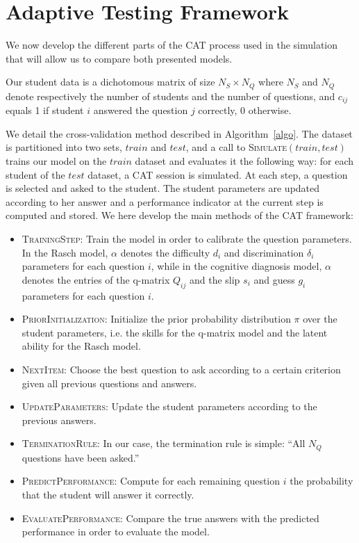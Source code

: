 \documentclass{edm_template}
\begin{document}

\section{Adaptive Testing Framework}

We now develop the different parts of the CAT process used in the simulation that will allow us to compare both presented models.

Our student data is a dichotomous matrix of size $N_S \times N_Q$ where $N_S$ and $N_Q$ denote respectively the number of students and the number of questions, and $c_{ij}$ equals 1 if student $i$ answered the question $j$ correctly, 0 otherwise. 

We detail the cross-validation method described in Algorithm~\ref{algo}. The dataset is partitioned into two sets, $train$ and $test$, and a call to \textsc{Simulate}$(train, test)$ trains our model on the $train$ dataset and evaluates it the following way: for each student of the $test$ dataset, a CAT session is simulated. At each step, a question is selected and asked to the student. The student parameters are updated according to her answer and a performance indicator at the current step is computed and stored. We here develop the main methods of the CAT framework:

\begin{itemize}
\item \textsc{TrainingStep}: Train the model in order to calibrate the question parameters. In the Rasch model, $\alpha$ denotes the difficulty $d_i$ and discrimination $\delta_i$ parameters for each question $i$, while in the cognitive diagnosis model, $\alpha$ denotes the entries of the q-matrix $Q_{ij}$ and the slip $s_i$ and guess $g_i$ parameters for each question $i$.
\item \textsc{PriorInitialization}: Initialize the prior probability distribution $\pi$ over the student parameters, i.e. the skills for the q-matrix model and the latent ability for the Rasch model. 
\item \textsc{NextItem}: Choose the best question to ask according to a certain criterion given all previous questions and answers. 
\item \textsc{UpdateParameters}: Update the student parameters according to the previous answers.
\item \textsc{TerminationRule}: In our case, the termination rule is simple: ``All $N_Q$ questions have been asked.''
\item \textsc{PredictPerformance}: Compute for each remaining question $i$ the probability that the student will answer it correctly.
\item \textsc{EvaluatePerformance}: Compare the true answers with the predicted performance in order to evaluate the model. 
\end{itemize}
\end{document}
